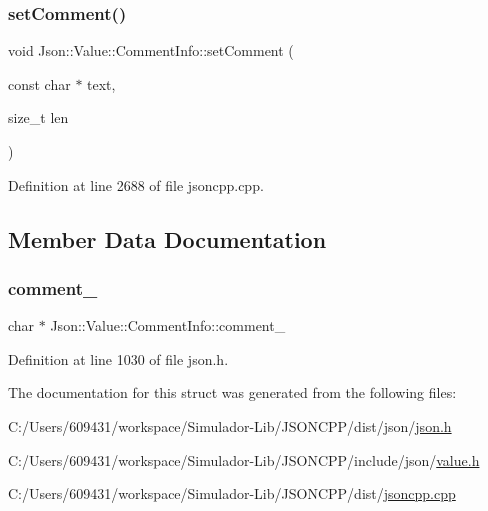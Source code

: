 \hypertarget{struct_json_1_1_value_1_1_comment_info_a4d01c2cd8c07995969c5d636dfd4fa8c}{}\label{struct_json_1_1_value_1_1_comment_info_a4d01c2cd8c07995969c5d636dfd4fa8c} 
\subsubsection{\texorpdfstring{set\+Comment()}{setComment()}\hspace{0.1cm}{\footnotesize\ttfamily [2/2]}}
{\footnotesize\ttfamily void Json\+::\+Value\+::\+Comment\+Info\+::set\+Comment (\begin{DoxyParamCaption}\item[{const char $\ast$}]{text,  }\item[{size\+\_\+t}]{len }\end{DoxyParamCaption})}



Definition at line 2688 of file jsoncpp.\+cpp.



\subsection{Member Data Documentation}
\hypertarget{struct_json_1_1_value_1_1_comment_info_ac80f716e6784d896c84809f529b17d65}{}\label{struct_json_1_1_value_1_1_comment_info_ac80f716e6784d896c84809f529b17d65} 
\subsubsection{\texorpdfstring{comment\+\_\+}{comment\_}}
{\footnotesize\ttfamily char $\ast$ Json\+::\+Value\+::\+Comment\+Info\+::comment\+\_\+}



Definition at line 1030 of file json.\+h.



The documentation for this struct was generated from the following files\+:\begin{DoxyCompactItemize}
\item 
C\+:/\+Users/609431/workspace/\+Simulador-\/\+Lib/\+J\+S\+O\+N\+C\+P\+P/dist/json/\hyperlink{dist_2json_2json_8h}{json.\+h}\item 
C\+:/\+Users/609431/workspace/\+Simulador-\/\+Lib/\+J\+S\+O\+N\+C\+P\+P/include/json/\hyperlink{value_8h}{value.\+h}\item 
C\+:/\+Users/609431/workspace/\+Simulador-\/\+Lib/\+J\+S\+O\+N\+C\+P\+P/dist/\hyperlink{jsoncpp_8cpp}{jsoncpp.\+cpp}\end{DoxyCompactItemize}
